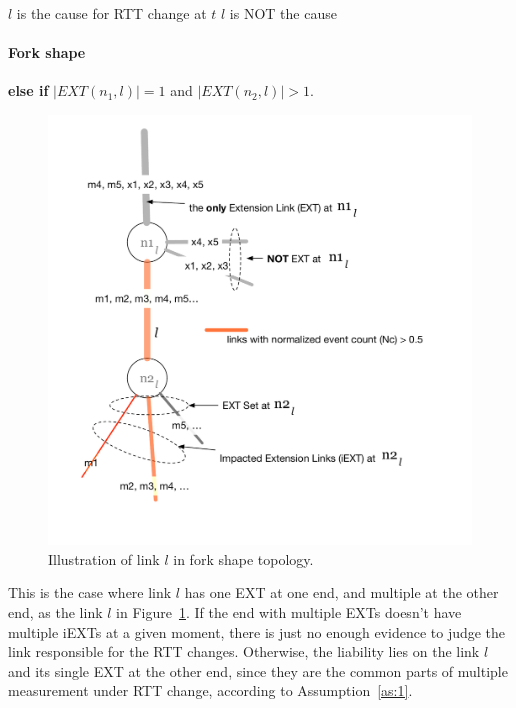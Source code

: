 \begin{algorithmic}
\State $l$ is the cause for RTT change at $t$ 
\Else
\State $l$ is NOT the cause
\EndIf
\end{algorithmic}


\paragraph{Fork shape} \textbf{else if} $|EXT(n_1, l)| = 1$ and  $|EXT(n_2, l)| > 1$.

\begin{figure}[!htb]
\centering
\includegraphics[width=.9\textwidth]{gfx/chap5/fork_shape.pdf}
\caption{Illustration of link $l$ in fork shape topology.}
\label{fig:chap5_fork_shape}
\end{figure}

This is the case where link $l$ has one \ac{EXT} at one end, and multiple at the other end, as the link $l$ in Figure~\ref{fig:chap5_fork_shape}. If the end with multiple \acp{EXT} doesn't have multiple \acp{iEXT} at a given moment, there is just no enough evidence to judge the link responsible for the RTT changes. Otherwise, the liability lies on the link $l$ and its single \ac{EXT} at the other end, since they are the common parts of multiple measurement under RTT change, according to Assumption~\ref{as:1}.

